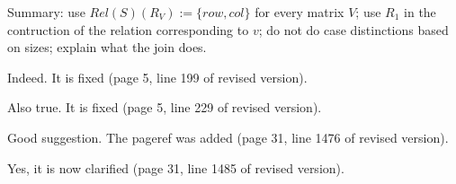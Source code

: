 Summary: use $Rel(S)(R_V) := \{row, col\}$ for every matrix $V$; use $R_1$ in the contruction of the relation corresponding to $v$; do not do case distinctions based on sizes; explain what the join does.

\bigskip

\begin{comment}
line 183: this is ugly to read. Please align at := and at if.
\end{comment}

\answer Indeed. It is fixed (page 5, line 199 of revised version).
\bigskip

\begin{comment}
	line 216: this also should be aligned.
\end{comment}

\answer Also true. It is fixed (page 5, line 229 of revised version).
\bigskip

\begin{comment}
	line 1386: Please rephrase. One could get the impression that the halting problem for linear time TMs is undecidable (which it certainly is not).
\end{comment}

\answer \TODO
{}
\bigskip

\begin{comment}
	line 1435: please provide a pageref for figure 4 or mention that it is at the very end of the article.
\end{comment}

\answer Good suggestion. The pageref was added (page 31, line 1476 of revised version).
\bigskip

\begin{comment}
	line 1443: You have to restrict the expression e, such that it cannot use X. Otherwise Proposition 6.1 is definitely not true.
\end{comment}

\answer Yes, it is now clarified (page 31, line 1485 of revised version).
\bigskip

\begin{comment}
	line 1449: Using your ill-defined definition of expressions of polynomial
	degree, the proof of Proposition 6.1 is nontrivial and cannot be omitted. You
	have to show that every expression of sum-MATLANG can be converted to a
	circuit family of polynomial degree, meeting the syntactic definition of the circuits.
	Showing that you cannot produce superpolynomial matrix entries is not enough.
\end{comment}

